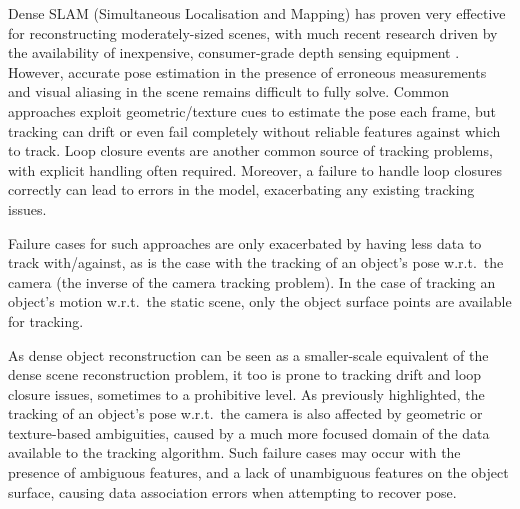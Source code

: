 Dense SLAM (Simultaneous Localisation and Mapping) has proven very effective for reconstructing moderately-sized scenes,
with much recent research driven by the availability of inexpensive, consumer-grade depth sensing equipment \cite{Newcombe2011,Niessner2013,Prisacariu2014}. 
However, accurate pose estimation in the presence of erroneous measurements and visual aliasing in the scene remains difficult to fully solve. Common approaches \cite{Besl1992,Levoy2001} exploit geometric/texture cues to estimate the pose each frame, but tracking can drift or even fail completely without reliable features against which to track.
Loop closure events are another common source of tracking problems, with explicit handling often required. Moreover, a failure to handle loop closures correctly can lead to errors in the model, exacerbating any existing tracking issues.

Failure cases for such approaches are only exacerbated by having less data to track with/against, as is the case with the tracking of an 
object's pose w.r.t.\ the camera (the inverse of the camera tracking problem). In the case of tracking an object's motion w.r.t.\ the static 
scene, only the object surface points are available for tracking.

As dense object reconstruction can be seen as a smaller-scale equivalent of the dense scene reconstruction problem, it too is prone to 
tracking drift and loop closure issues, sometimes to a prohibitive level. As previously highlighted, the tracking of an object's pose w.r.t.\ the camera 
is also affected by geometric or texture-based ambiguities, caused by a much more focused domain of the data available to the tracking algorithm. 
Such failure cases may occur with the presence of ambiguous features, and a lack of unambiguous features on the object surface, causing data 
association errors when attempting to recover pose.

